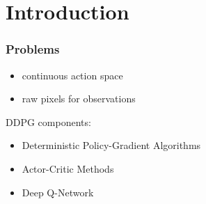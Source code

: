 \section{Introduction}

\begin{frame}
\frametitle{Problems}
\begin{itemize}
  \item continuous action space
  \item raw pixels for observations
\end{itemize}

DDPG components:
\begin{itemize}
  \item Deterministic Policy-Gradient Algorithms \cite{Silver2014}
  \item Actor-Critic Methods \cite{Sutton1998}
  \item Deep Q-Network \cite{Mnih2013}
\end{itemize}
\end{frame}
